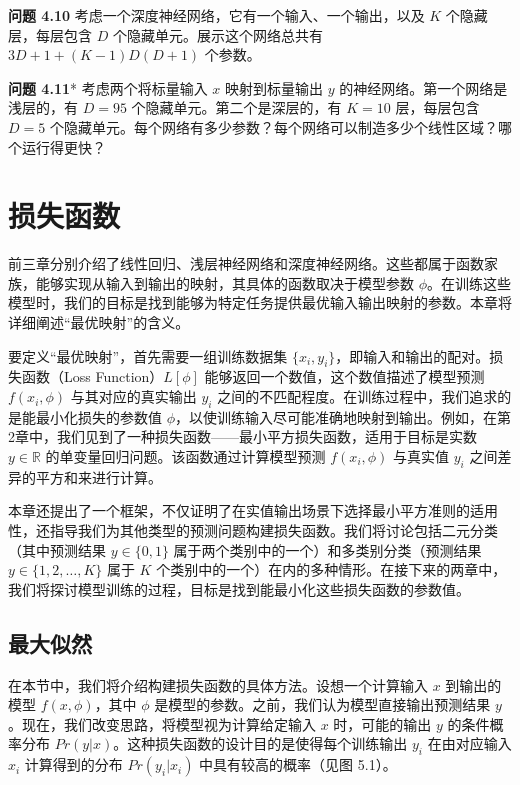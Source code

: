 \documentclass[lang=cn,newtx,10pt,scheme=chinese]{elegantbook}
\begin{document}
\textbf{问题 4.10} 考虑一个深度神经网络，它有一个输入、一个输出，以及 \(K\) 个隐藏层，每层包含 \(D\) 个隐藏单元。展示这个网络总共有 \(3D + 1 + (K - 1)D(D + 1)\) 个参数。

\textbf{问题 4.11}* 考虑两个将标量输入 \(x\) 映射到标量输出 \(y\) 的神经网络。第一个网络是浅层的，有 \(D = 95\) 个隐藏单元。第二个是深层的，有 \(K = 10\) 层，每层包含 \(D = 5\) 个隐藏单元。每个网络有多少参数？每个网络可以制造多少个线性区域？哪个运行得更快？


\chapter{损失函数}

前三章分别介绍了线性回归、浅层神经网络和深度神经网络。这些都属于函数家族，能够实现从输入到输出的映射，其具体的函数取决于模型参数 \(\phi\)。在训练这些模型时，我们的目标是找到能够为特定任务提供最优输入输出映射的参数。本章将详细阐述“最优映射”的含义。

要定义“最优映射”，首先需要一组训练数据集 \(\{x_i, y_i\}\)，即输入和输出的配对。损失函数（Loss Function）\(L[\phi]\) 能够返回一个数值，这个数值描述了模型预测 \(f(x_i, \phi)\) 与其对应的真实输出 \(y_i\) 之间的不匹配程度。在训练过程中，我们追求的是能最小化损失的参数值 \(\phi\)，以使训练输入尽可能准确地映射到输出。例如，在第2章中，我们见到了一种损失函数——最小平方损失函数，适用于目标是实数 \(y \in \mathbb{R}\) 的单变量回归问题。该函数通过计算模型预测 \(f(x_i, \phi)\) 与真实值 \(y_i\) 之间差异的平方和来进行计算。

本章还提出了一个框架，不仅证明了在实值输出场景下选择最小平方准则的适用性，还指导我们为其他类型的预测问题构建损失函数。我们将讨论包括二元分类（其中预测结果 \(y \in \{0, 1\}\) 属于两个类别中的一个）和多类别分类（预测结果 \(y \in \{1, 2, \ldots, K\}\) 属于 \(K\) 个类别中的一个）在内的多种情形。在接下来的两章中，我们将探讨模型训练的过程，目标是找到能最小化这些损失函数的参数值。

\section{最大似然}

在本节中，我们将介绍构建损失函数的具体方法。设想一个计算输入 \(x\) 到输出的模型 \(f(x, \phi)\)，其中 \(\phi\) 是模型的参数。之前，我们认为模型直接输出预测结果 \(y\)。现在，我们改变思路，将模型视为计算给定输入 \(x\) 时，可能的输出 \(y\) 的条件概率分布 \(Pr(y|x)\)。这种损失函数的设计目的是使得每个训练输出 \(y_i\) 在由对应输入 \(x_i\) 计算得到的分布 \(Pr(y_i|x_i)\) 中具有较高的概率（见图 5.1）。
\end{document}
